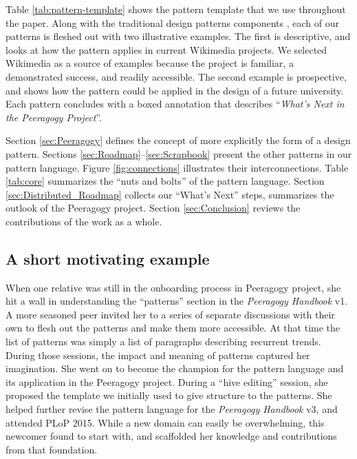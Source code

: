 Table \ref{tab:pattern-template} shows the pattern template that we use throughout the paper.  
Along with the traditional design patterns components \cite{meszaros1998pattern}, each of our patterns is fleshed out with two illustrative examples.  The first is descriptive, and looks at how the pattern applies in current Wikimedia projects.  We selected Wikimedia as a source of examples because the project is familiar, a demonstrated success, and readily accessible.  The second example is prospective, and shows how the pattern could be applied in the design of a future university.  Each pattern concludes with a boxed annotation that describes ``\emph{What's Next in the Peeragogy Project}''.

Section \ref{sec:Peeragogy} defines the concept of  more explicitly the form of a design pattern.  Sections \ref{sec:Roadmap}--\ref{sec:Scrapbook} present the other patterns in our pattern language. Figure \ref{fig:connections} illustrates their interconnections. Table \ref{tab:core} summarizes the ``nuts and bolts'' of the pattern language.
Section \ref{sec:Distributed_Roadmap} collects our ``What's Next'' steps, summarizes the outlook of the Peeragogy project. Section \ref{sec:Conclusion} reviews the contributions of the work as a whole.%

\subsection*{A short motivating example}
When one relative  was still in the onboarding process in Peeragogy project, she hit a wall in understanding the ``patterns'' section in the \emph{Peeragogy Handbook} v1.  A more seasoned peer invited her to a series of separate discussions with their own  to flesh out the patterns and make them more accessible.  At that time the list of patterns was simply a list of paragraphs describing recurrent trends.  During those sessions, the impact and meaning of patterns captured her imagination.  She went on to become the champion for the pattern language and its application in the Peeragogy project.  During a ``hive editing'' session, she proposed the template we initially used to give structure to the patterns.  She helped further revise the pattern language for the \emph{Peeragogy Handbook}  v3, and attended PLoP 2015.  While a new domain can easily be overwhelming, this newcomer found  to start with, and scaffolded her knowledge and contributions from that foundation.

